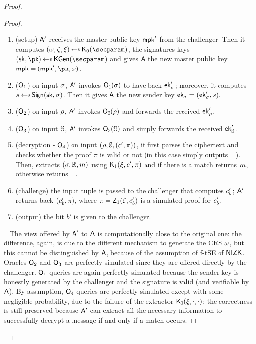 \begin{proof}
\begin{lemma}
\begin{proof}
            \begin{enumerate}
                \item (setup) $\mathsf{A}'$ receives the master public key $\mathsf{mpk}'$ from the challenger. Then it computes $(\crs,\tpsim,\tpext)\getsr\nizkext_0(\secparam)$, the signatures keys $(\sk, \pk) \getsr \kgen(\secparam)$ and gives $\mathsf{A}$ the new master public key $\mpk = (\mpk', \pk, \crs)$.
                \item ($\mathsf{O}_1$) on input $\sigma$, $\mathsf{A}'$ invokes $\mathsf{O}_1(\sigma)$ to have back $\mathsf{ek}'_\sigma$; moreover, it computes $\signature \getsr \sign(\sk, \sattr)$. Then it gives $\mathsf{A}$ the new sender key $\mathsf{ek}_\sigma = (\mathsf{ek}'_\sigma, s)$.
                \item ($\mathsf{O}_2$) on input $\rho$, $\mathsf{A}'$ invokes $\mathsf{O}_2(\rho)$ and forwards the received $\mathsf{ek}'_\rho$.
                \item ($\mathsf{O}_3$) on input $\mathbb{S}$, $\mathsf{A}'$ invokes $\mathsf{O}_3(\mathbb{S})$ and simply forwards the received $\mathsf{ek}'_{\mathbb{S}}$.
                \item (decryption - $\mathsf{O}_4$) on input $(\rho, \mathbb{S}, (c', \pi))$, it first parses the ciphertext and checks whether the proof $\pi$ is valid or not (in this case simply outputs $\bot$). Then, extracts $(\sigma, \mathbb{R}, m)$ using $\mathsf{K}_1(\xi,c',\pi)$ and if there is a match returns $m$, otherwise returns $\bot$.
                \item (challenge) the input tuple is passed to the challenger that computes $c'_b$; $\mathsf{A}'$ returns back $(c'_b, \pi)$, where $\pi = \mathsf{Z}_1(\zeta, c'_b)$ is a simulated proof for $c'_b$.
                \item (output) the bit $b'$ is given to the challenger.
            \end{enumerate}
            ~\newline
            The view offered by $\mathsf{A}'$ to $\mathsf{A}$ is computationally close to the original one: the difference, again, is due to the different mechanism to generate the CRS $\omega$, but this cannot be distinguished by $\mathsf{A}$, because of the assumption of f-tSE of $\mathsf{NIZK}$.
            Oracles $\mathsf{O}_2$ and $\mathsf{O}_3$ are perfectly simulated since they are offered directly by the challenger.
            $\mathsf{O}_1$ queries are again perfectly simulated because the sender key is honestly generated by the challenger and the signature is valid (and verifiable by $\mathsf{A}$).
            By assumption, $\mathsf{O}_4$ queries are perfectly simulated except with some negligible probability, due to the failure of the extractor $\mathsf{K}_1(\xi, \cdot, \cdot)$: the correctness is still preserved because $\mathsf{A}'$ can extract all the necessary information to successfully decrypt a message if and only if a match occurs.
        \end{proof}
    \end{lemma}


\end{proof}
